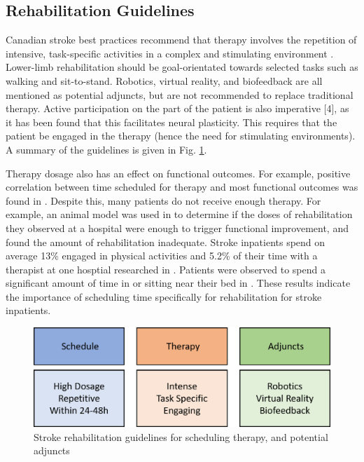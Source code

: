 \documentclass[12pt]{report}
\begin{document}
\subsection{Rehabilitation Guidelines}

Canadian stroke best practices recommend that therapy involves the repetition of intensive, task-specific activities in a complex and stimulating environment \cite{Hebert2016}. Lower-limb rehabilitation should be goal-orientated towards selected tasks such as walking and sit-to-stand. Robotics, virtual reality, and biofeedback are all mentioned as potential adjuncts, but are not recommended to replace traditional therapy.  Active participation on the part of the patient is also imperative [4], as it has been found that this facilitates neural plasticity. This requires that the patient be engaged in the therapy (hence the need for stimulating environments). A summary of the guidelines is given in Fig. \ref{fig:guidelines}. 

Therapy dosage also has an effect on functional outcomes. For example, positive correlation between time scheduled for therapy and most functional outcomes was found in \cite{Lohse2014}. Despite this, many patients do not receive enough therapy. For example, an animal model was used in \cite{Lang2009} to determine if the doses of rehabilitation they observed at a hospital were enough to trigger functional improvement, and found the amount of rehabilitation inadequate. Stroke inpatients spend on average 13\% engaged in physical activities and 5.2\% of their time with a therapist at one hosptial researched in \cite{Bernhardt2004}. Patients were observed to spend a significant amount of time in or sitting near their bed in \cite{King2011}. These results indicate the importance of scheduling time specifically for rehabilitation for stroke inpatients. 

	\begin{figure}[h] 
		\centering
		\includegraphics[width=0.75\linewidth]{guidelines}
		\caption{Stroke rehabilitation guidelines for scheduling therapy, and potential adjuncts}
		\label{fig:guidelines}
	\end{figure}
\end{document}
